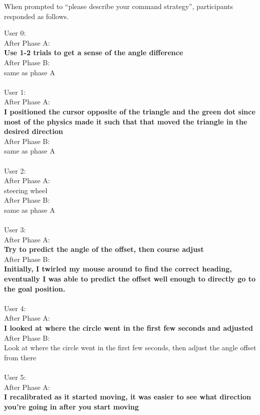 \documentclass{article}
\begin{document}
When prompted to ``please describe your command strategy'', participants responded as follows.
\begin{displayquote}
\small
User 0: \\
After Phase A: \\
\textbf{Use 1-2 trials to get a sense of the angle difference} \\
After Phase B: \\
same as phase A \\
\\
User 1: \\
After Phase A: \\
\textbf{I positioned the cursor opposite of the triangle and the green dot since most of the physics made it such that that moved the triangle in the desired direction} \\
After Phase B: \\
same as phase A \\
\\
User 2: \\
After Phase A: \\
steering wheel \\
After Phase B: \\
same as phase A \\
\\
User 3: \\
After Phase A: \\
\textbf{Try to predict the angle of the offset, then course adjust} \\
After Phase B: \\
\textbf{Initially, I twirled my mouse around to find the correct heading, eventually I was able to predict the offset well enough to directly go to the goal position.} \\
\\
User 4: \\
After Phase A: \\
\textbf{I looked at where the circle went in the first few seconds and adjusted} \\
After Phase B: \\
Look at where the circle went in the first few seconds, then adjust the angle offset from there \\
\\
User 5: \\
After Phase A: \\
\textbf{I recalibrated as it started moving, it was easier to see what direction you're going in after you start moving} \\

\end{displayquote}
\end{document}
